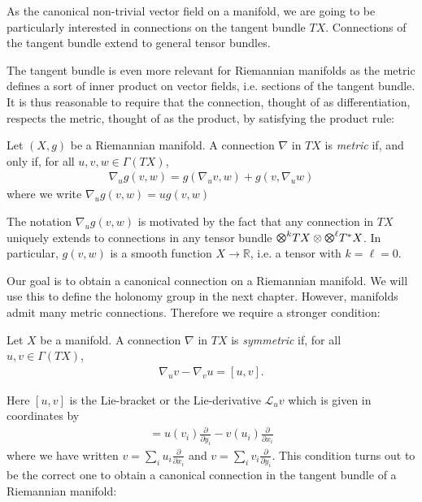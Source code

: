 \documentclass{article}
\begin{document}
As the canonical non-trivial vector field on a manifold,
we are going to be particularly interested in connections on the
tangent bundle $TX$. Connections of the tangent bundle extend to
general tensor bundles.

The tangent bundle is even more relevant for
Riemannian manifolds as the metric defines a sort of inner product
on vector fields, i.e. sections of the tangent bundle.
It is thus reasonable to require that the connection, thought of
as differentiation, respects the metric, thought of as the product,
by satisfying the product rule:

\begin{definition}
  Let $(X,g)$ be a Riemannian manifold. A connection $\nabla$ in $TX$ is
  \emph{metric} if, and only if, for all $u,v,w\in\Gamma(TX)$,
  \begin{align*}
    \nabla_u g(v,w) = g(\nabla_u v, w) + g(v,\nabla_u w)
  \end{align*}
  where we write $\nabla_u g(v,w) = u g(v,w)$
\end{definition}

The notation $\nabla_u g(v,w)$ is motivated by the fact that any
connection in $TX$ uniquely extends to connections in any tensor bundle
$\tensor{}{k}{TX}\otimes\tensor{}{\ell}{T^*X}$. In particular, $g(v,w)$
is a smooth function $X\to\mathbb{R}$, i.e. a tensor with $k=\ell=0$.
\cite{lee2018}

Our goal is to obtain a canonical connection on a Riemannian manifold.
We will use this to define the holonomy group in the next chapter.
However, manifolds admit many metric connections. Therefore we require
a stronger condition:

\begin{definition}
  Let $X$ be a manifold. A connection $\nabla$ in $TX$ is
  \emph{symmetric} if, for all $u,v\in\Gamma(TX)$,
  \begin{align*}
    \nabla_u v - \nabla_v u = [u,v].
  \end{align*}
\end{definition}

Here $[u,v]$ is the Lie-bracket or the Lie-derivative $\mathcal L_u v$
which is given in coordinates by
\begin{align*}
  [u,v] = u(v_i)\frac{\partial }{\partial y_i} - v(u_i)\frac{\partial}{\partial x_i}
\end{align*}
where we have written $v=\sum_i u_i\frac{\partial}{\partial x_i}$
and $v=\sum_i v_i\frac{\partial}{\partial y_i}$.
This condition turns out to be the correct one to obtain a canonical connection in the tangent bundle of a Riemannian manifold:
\end{document}
